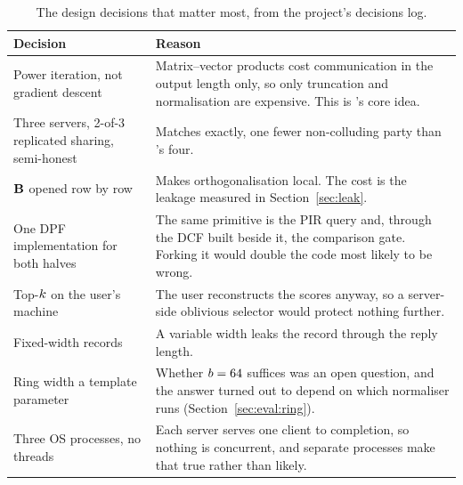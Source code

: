 \begin{table}[t]
\centering
\small
\caption{The design decisions that matter most, from the project's decisions
log.}
\label{tab:decisions}
\begin{tabular}{@{}p{5.0cm} p{9.6cm}@{}}
\toprule
Decision & Reason \\
\midrule
Power iteration, not gradient descent & Matrix--vector products cost
  communication in the output length only, so only truncation and normalisation
  are expensive. This is \nudgeplain{}'s core idea. \\
Three servers, 2-of-3 replicated sharing, semi-honest & Matches \nudgeplain{}
  exactly, one fewer non-colluding party than \pirsonaplain{}'s four. \\
$\mathbf{B}$ opened row by row & Makes orthogonalisation local. The cost is the
  leakage measured in Section~\ref{sec:leak}. \\
One DPF implementation for both halves & The same primitive is the PIR query and,
  through the DCF built beside it, the comparison gate. Forking it would double
  the code most likely to be wrong. \\
Top-$k$ on the user's machine & The user reconstructs the scores anyway, so a
  server-side oblivious selector would protect nothing further. \\
Fixed-width records & A variable width leaks the record through the reply
  length. \\
Ring width a template parameter & Whether $b = 64$ suffices was an open
  question, and the answer turned out to depend on which normaliser runs
  (Section~\ref{sec:eval:ring}). \\
Three OS processes, no threads & Each server serves one client to completion, so
  nothing is concurrent, and separate processes make that true rather than
  likely. \\
\bottomrule
\end{tabular}
\end{table}
